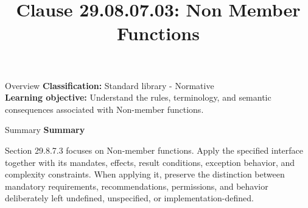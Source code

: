 \documentclass[10pt,letterpaper]{article}
\title{Clause 29.08.07.03: Non Member Functions}
\author{}
\date{}
\begin{document}
\maketitle
\begin{CornellOverviewBox}{Overview}
\textbf{Classification:} Standard library - Normative\\[2pt]
\textbf{Learning objective:} Understand the rules, terminology, and semantic consequences associated with Non-member functions.
\end{CornellOverviewBox}\begin{CornellSummaryBox}{Summary}
{\sffamily\bfseries\color{Accent} Summary}\par\vspace{3pt}Section 29.8.7.3 focuses on Non-member functions. Apply the specified interface together with its mandates, effects, result conditions, exception behavior, and complexity constraints. When applying it, preserve the distinction between mandatory requirements, recommendations, permissions, and behavior deliberately left undefined, unspecified, or implementation-defined.
\end{CornellSummaryBox}
\end{document}

